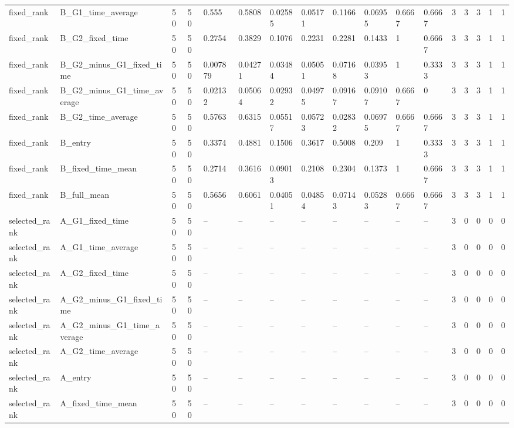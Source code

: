 \begin{longtable}{lllllllllllllllll}
fixed\_rank & B\_G1\_time\_average & 50 & 50 & 0.555 & 0.5808 & 0.02585 & 0.05171 & 0.1166 & 0.06955 & 0.6667 & 0.6667 & 3 & 3 & 3 & 1 & 1 \\
fixed\_rank & B\_G2\_fixed\_time & 50 & 50 & 0.2754 & 0.3829 & 0.1076 & 0.2231 & 0.2281 & 0.1433 & 1 & 0.6667 & 3 & 3 & 3 & 1 & 1 \\
fixed\_rank & B\_G2\_minus\_G1\_fixed\_time & 50 & 50 & 0.007879 & 0.04271 & 0.03484 & 0.05051 & 0.07168 & 0.03953 & 1 & 0.3333 & 3 & 3 & 3 & 1 & 1 \\
fixed\_rank & B\_G2\_minus\_G1\_time\_average & 50 & 50 & 0.02132 & 0.05064 & 0.02932 & 0.04975 & 0.09167 & 0.09107 & 0.6667 & 0 & 3 & 3 & 3 & 1 & 1 \\
fixed\_rank & B\_G2\_time\_average & 50 & 50 & 0.5763 & 0.6315 & 0.05517 & 0.05723 & 0.02832 & 0.06975 & 0.6667 & 0.6667 & 3 & 3 & 3 & 1 & 1 \\
fixed\_rank & B\_entry & 50 & 50 & 0.3374 & 0.4881 & 0.1506 & 0.3617 & 0.5008 & 0.209 & 1 & 0.3333 & 3 & 3 & 3 & 1 & 1 \\
fixed\_rank & B\_fixed\_time\_mean & 50 & 50 & 0.2714 & 0.3616 & 0.09013 & 0.2108 & 0.2304 & 0.1373 & 1 & 0.6667 & 3 & 3 & 3 & 1 & 1 \\
fixed\_rank & B\_full\_mean & 50 & 50 & 0.5656 & 0.6061 & 0.04051 & 0.04854 & 0.07143 & 0.05283 & 0.6667 & 0.6667 & 3 & 3 & 3 & 1 & 1 \\
selected\_rank & A\_G1\_fixed\_time & 50 & 50 & -- & -- & -- & -- & -- & -- & -- & -- & 3 & 0 & 0 & 0 & 0 \\
selected\_rank & A\_G1\_time\_average & 50 & 50 & -- & -- & -- & -- & -- & -- & -- & -- & 3 & 0 & 0 & 0 & 0 \\
selected\_rank & A\_G2\_fixed\_time & 50 & 50 & -- & -- & -- & -- & -- & -- & -- & -- & 3 & 0 & 0 & 0 & 0 \\
selected\_rank & A\_G2\_minus\_G1\_fixed\_time & 50 & 50 & -- & -- & -- & -- & -- & -- & -- & -- & 3 & 0 & 0 & 0 & 0 \\
selected\_rank & A\_G2\_minus\_G1\_time\_average & 50 & 50 & -- & -- & -- & -- & -- & -- & -- & -- & 3 & 0 & 0 & 0 & 0 \\
selected\_rank & A\_G2\_time\_average & 50 & 50 & -- & -- & -- & -- & -- & -- & -- & -- & 3 & 0 & 0 & 0 & 0 \\
selected\_rank & A\_entry & 50 & 50 & -- & -- & -- & -- & -- & -- & -- & -- & 3 & 0 & 0 & 0 & 0 \\
selected\_rank & A\_fixed\_time\_mean & 50 & 50 & -- & -- & -- & -- & -- & -- & -- & -- & 3 & 0 & 0 & 0 & 0 \\

\end{longtable}
